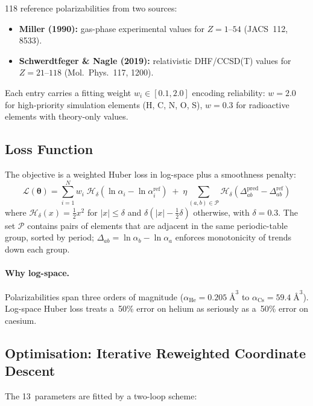 \documentclass[11pt,letterpaper]{article}
\newcommand{\Ang}{\text{\AA}}
\begin{document}
118 reference polarizabilities from two sources:
\begin{itemize}
\item \textbf{Miller (1990):} gas-phase experimental values for
  $Z=1$--$54$ (JACS~112, 8533).
\item \textbf{Schwerdtfeger \& Nagle (2019):} relativistic
  DHF/CCSD(T) values for $Z=21$--$118$ (Mol.\ Phys.~117, 1200).
\end{itemize}
Each entry carries a fitting weight $w_i \in [0.1, 2.0]$ encoding
reliability: $w = 2.0$ for high-priority simulation elements (H, C, N, O,
S), $w = 0.3$ for radioactive elements with theory-only values.

\subsection{Loss Function}

The objective is a weighted Huber loss in log-space plus a smoothness
penalty:
\begin{equation}
\mathcal{L}(\bm\theta) = \sum_{i=1}^{N} w_i \;\mathcal{H}_\delta\!\left(
  \ln\hat\alpha_i - \ln\alpha_i^{\mathrm{ref}}\right)
\;+\; \eta \sum_{(a,b)\in\mathcal{P}} \mathcal{H}_\delta\!\left(
  \Delta_{ab}^{\mathrm{pred}} - \Delta_{ab}^{\mathrm{ref}}\right)
\label{eq:loss}
\end{equation}
where $\mathcal{H}_\delta(x) = \tfrac{1}{2}x^2$ for $|x| \le \delta$
and $\delta(|x| - \tfrac{1}{2}\delta)$ otherwise, with $\delta = 0.3$.
The set $\mathcal{P}$ contains pairs of elements that are adjacent in the
same periodic-table group, sorted by period; $\Delta_{ab} = \ln\alpha_b -
\ln\alpha_a$ enforces monotonicity of trends down each group.

\paragraph{Why log-space.}  Polarizabilities span three orders of magnitude
($\alpha_{\mathrm{He}} = 0.205\;\Ang^3$ to
$\alpha_{\mathrm{Cs}} = 59.4\;\Ang^3$).  Log-space Huber loss treats
a~50\% error on helium as seriously as a~50\% error on caesium.

\subsection{Optimisation: Iterative Reweighted Coordinate Descent}

The 13~parameters are fitted by a two-loop scheme:
\end{document}
